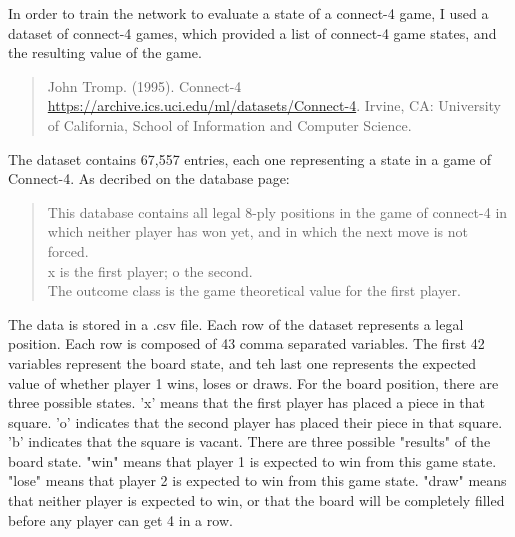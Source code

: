 \documentclass[10pt]{article}
\begin{document}
In order to train the network to evaluate a state of a connect-4 game, I used a dataset of connect-4 games, which provided a list of connect-4 game states, and the resulting value of the game.
\begin{quote}
    John Tromp. (1995). Connect-4 \url{https://archive.ics.uci.edu/ml/datasets/Connect-4}. Irvine, CA: University of California, School of Information and Computer Science.
\end{quote}
The dataset contains 67,557 entries, each one representing a state in a game of Connect-4. As decribed on the database page:
\begin{quote}
    This database contains all legal 8-ply positions in the game of connect-4 in which neither player has won yet, and in which the next move is not forced.\\
x is the first player; o the second.\\
The outcome class is the game theoretical value for the first player.
\end{quote}
The data is stored in a .csv file. Each row of the dataset represents a legal position. Each row is composed of 43 comma separated variables. The first 42 variables represent the board state, and teh last one represents the expected value of whether player 1 wins, loses or draws.\newline
For the board position, there are three possible states. 'x' means that the first player has placed a piece in that square. 'o' indicates that the second player has placed their piece in that square. 'b' indicates that the square is vacant.\newline
There are three possible "results" of the board state. "win" means that player 1 is expected to win from this game state. "lose" means that player 2 is expected to win from this game state. "draw" means that neither player is expected to win, or that the board will be completely filled before any player can get 4 in a row.
\end{document}
